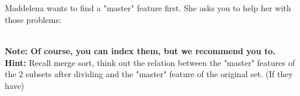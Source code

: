 \begin{parts}
\part{} 
Maddelena wants to find a "master" feature first. She asks you to help her with those problems:
\begin{subparts}
     \\
    \textbf{Note: Of course, you can index them, but we recommend you  to.} \\
    \textbf{Hint:} Recall merge sort, think out the relation between the "master" features of the $2$ subsets after dividing and the "master" feature of the original set. (If they have)
   \begin{solution} 
    \\
    \\
    \\
    \\
    \\
    \\
    \\
    \\ 
    \\
    \\
    \\
    \\
    \\
    \\
    \\
    \\
    \\
    \\
    \\
    \\
    \end{solution}
    \begin{solution} 
    \\
    \\
    \\
    \\
    \\
    \\
    \\
    \\
    \\
    \end{solution}
\end{subparts}


\end{parts}
